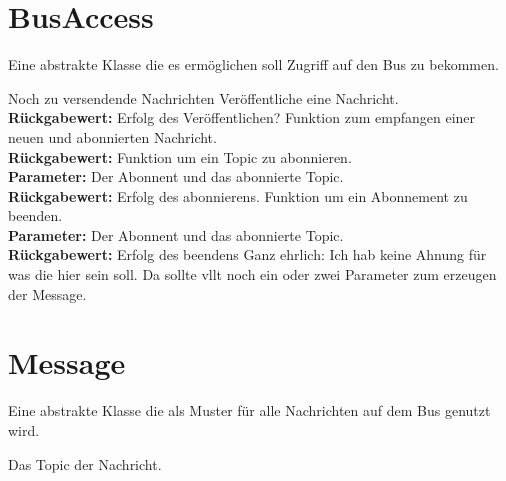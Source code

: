 \documentclass[entwurf.tex]{subfiles}
\begin{document}
	\section{BusAccess}
	\label{Class:BusAccess}
		Eine abstrakte Klasse die es ermöglichen soll Zugriff auf den Bus zu bekommen.
		\begin{description}
				Noch zu versendende Nachrichten
				Veröffentliche eine Nachricht.\\ 
				\textbf{Rückgabewert:} Erfolg des Veröffentlichen?
				Funktion zum empfangen einer neuen und abonnierten Nachricht.\\ 
				\textbf{Rückgabewert:}
				Funktion um ein Topic zu abonnieren.\\ 
				\textbf{Parameter:} Der Abonnent und das abonnierte Topic.\\ 
				\textbf{Rückgabewert:} Erfolg des abonnierens.
				Funktion um ein Abonnement zu beenden.\\ 
				\textbf{Parameter:} Der Abonnent und das abonnierte Topic.\\ 
				\textbf{Rückgabewert:} Erfolg des beendens
				Ganz ehrlich: Ich hab keine Ahnung für was die hier sein soll. Da sollte vllt noch ein oder zwei Parameter zum erzeugen der Message.
		\end{description}
  		
	\section{Message}
	\label{Class:Message}
		Eine abstrakte Klasse die als Muster für alle Nachrichten auf dem Bus genutzt wird.
		\begin{description}
			\attr{protected topic: Topic} 
				Das Topic der Nachricht.
		\end{description}
		

  	
\end{document}
